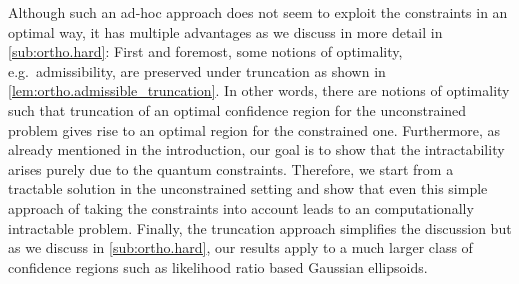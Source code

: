 Although such an ad-hoc approach does not seem to exploit the constraints in an optimal way, it has multiple advantages as we discuss in more detail in \cref{sub:ortho.hard}:
First and foremost, some notions of optimality, e.g.\ admissibility, are preserved under truncation as shown in \cref{lem:ortho.admissible_truncation}.
In other words, there are notions of optimality such that truncation of an optimal confidence region for the unconstrained problem gives rise to an optimal region for the constrained one.
Furthermore, as already mentioned in the introduction, our goal is to show that the intractability arises purely due to the quantum constraints.
Therefore, we start from a tractable solution in the unconstrained setting and show that even this simple approach of taking the constraints into account leads to an computationally intractable problem.
Finally, the truncation approach simplifies the discussion but as we discuss in \cref{sub:ortho.hard}, our results apply to a much larger class of confidence regions such as likelihood ratio based Gaussian ellipsoids.\\


